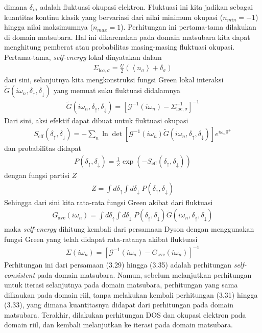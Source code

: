 dimana $\delta_{i\sigma}$ adalah fluktuasi okupasi elektron. Fluktuasi ini kita jadikan sebagai kuantitas kontinu klasik yang bervariasi dari nilai minimum okupasi ($n_{min} = -1$) hingga nilai maksimumnya ($n_{max} = 1$). Perhitungan ini pertama-tama dilakukan di domain matsubara. Hal ini dikarenakan pada domain matsubara kita dapat menghitung pemberat atau probabilitas masing-masing fluktuasi okupasi. Pertama-tama, \textit{self-energy} lokal dinyatakan dalam
\begin{align}
\Sigma_{\text{loc},\sigma} = \frac{U}{2}\left(\left< n_\sigma \right> + \delta_\sigma\right) 
\end{align}
dari sini, selanjutnya kita mengkonstruksi fungsi Green lokal interaksi $\tilde{G}(i\omega_n, \delta_{\uparrow}, \delta_{\downarrow})$ yang memuat suku fluktuasi didalamnya
\begin{align}
\tilde{G}(i\omega_n, \delta_{\uparrow}, \delta_{\downarrow}) = \left[ \mathcal{G}^{-1}(i\omega_n) - \Sigma_{\text{loc},\sigma}^{-1} \right]^{-1}
\end{align}
Dari sini, aksi efektif dapat dibuat untuk fluktuasi okupasi
\begin{align}
S_{\text{eff}}(\delta_\uparrow,\delta_\downarrow) = - \sum_n \ln \det \left[ \mathcal{G}^{-1}(i\omega_n) \tilde{G}(i\omega_n,\delta_\uparrow,\delta_\downarrow) \right] e^{i\omega_n 0^+}
\end{align}
dan probabilitas didapat
\begin{align}
P(\delta_\uparrow, \delta_\downarrow) = \frac{1}{Z} \exp(-S_{\text{eff}}(\delta_\uparrow,\delta_\downarrow))
\end{align}
dengan fungsi partisi $Z$
\begin{align}
Z = \int d\delta_\uparrow \int d\delta_\downarrow \; P(\delta_\uparrow, \delta_\downarrow)
\end{align}
Sehingga dari sini kita rata-rata fungsi Green akibat dari fluktuasi
\begin{align}
G_{\text{ave}}(i\omega_n) = \int d\delta_\uparrow \int d\delta_\downarrow \; P(\delta_\uparrow, \delta_\downarrow) \tilde{G}(i\omega_n, \delta_{\uparrow}, \delta_{\downarrow})
\end{align}
maka \textit{self-energy} dihitung kembali dari persamaan Dyson dengan menggunakan fungsi Green yang telah didapat rata-ratanya akibat fluktuasi
\begin{align}
\Sigma(i\omega_n) = \left[\mathcal{G}^{-1}(i\omega_n) - G_{\text{ave}}(i\omega_n)\right]^{-1}
\end{align}
Perhitungan ini dari persamaan (3.29) hingga (3.35) adalah perhitungan \textit{self-consistent} pada domain matsubara. Namun, sebelum melanjutkan perhitungan untuk iterasi selanjutnya pada domain matsubara, perhitungan yang sama dilkaukan pada domain riil, tanpa melakukan kembali perhitungan (3.31) hingga (3.33), yang dimana kuantitasnya didapat dari perhitungan pada domain matsubara. Terakhir, dilakukan perhitungan DOS dan okupasi elektron pada domain riil, dan kembali melanjutkan ke iterasi pada domain matsubara.

